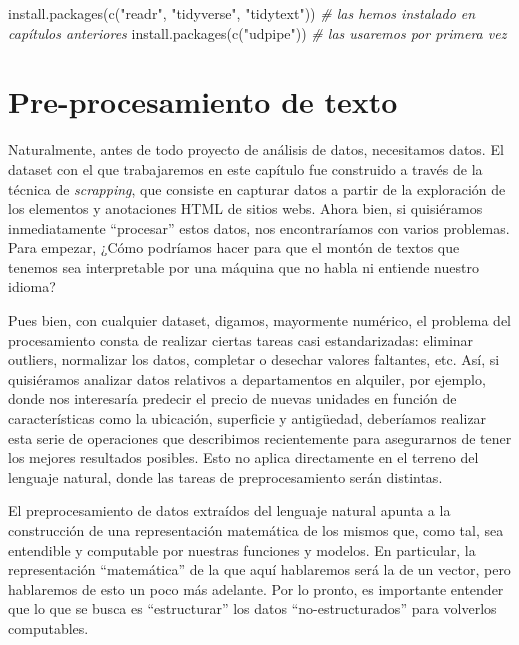 \documentclass[
]{book}
\newenvironment{Shaded}{\begin{snugshade}}{\end{snugshade}}
\newcommand{\CommentTok}[1]{\textcolor[rgb]{0.56,0.35,0.01}{\textit{#1}}}
\newcommand{\FunctionTok}[1]{\textcolor[rgb]{0.00,0.00,0.00}{#1}}
\newcommand{\NormalTok}[1]{#1}
\newcommand{\StringTok}[1]{\textcolor[rgb]{0.31,0.60,0.02}{#1}}
\begin{document}
\begin{Shaded}
\begin{Highlighting}[]
\FunctionTok{install.packages}\NormalTok{(}\FunctionTok{c}\NormalTok{(}\StringTok{"readr"}\NormalTok{, }\StringTok{"tidyverse"}\NormalTok{, }\StringTok{"tidytext"}\NormalTok{)) }\CommentTok{\# las hemos instalado en capítulos anteriores}
\FunctionTok{install.packages}\NormalTok{(}\FunctionTok{c}\NormalTok{(}\StringTok{"udpipe"}\NormalTok{)) }\CommentTok{\# las usaremos por primera vez}
\end{Highlighting}
\end{Shaded}

\hypertarget{pre-procesamiento-de-texto}{%
\section{Pre-procesamiento de texto}\label{pre-procesamiento-de-texto}}

Naturalmente, antes de todo proyecto de análisis de datos, necesitamos datos. El dataset con el que trabajaremos en este capítulo fue construido a través de la técnica de \emph{scrapping}, que consiste en capturar datos a partir de la exploración de los elementos y anotaciones HTML de sitios webs. Ahora bien, si quisiéramos inmediatamente ``procesar'' estos datos, nos encontraríamos con varios problemas. Para empezar, ¿Cómo podríamos hacer para que el montón de textos que tenemos sea interpretable por una máquina que no habla ni entiende nuestro idioma?

Pues bien, con cualquier dataset, digamos, mayormente numérico, el problema del procesamiento consta de realizar ciertas tareas casi estandarizadas: eliminar outliers, normalizar los datos, completar o desechar valores faltantes, etc. Así, si quisiéramos analizar datos relativos a departamentos en alquiler, por ejemplo, donde nos interesaría predecir el precio de nuevas unidades en función de características como la ubicación, superficie y antigüedad, deberíamos realizar esta serie de operaciones que describimos recientemente para asegurarnos de tener los mejores resultados posibles. Esto no aplica directamente en el terreno del lenguaje natural, donde las tareas de preprocesamiento serán distintas.

El preprocesamiento de datos extraídos del lenguaje natural apunta a la construcción de una representación matemática de los mismos que, como tal, sea entendible y computable por nuestras funciones y modelos. En particular, la representación ``matemática'' de la que aquí hablaremos será la de un vector, pero hablaremos de esto un poco más adelante. Por lo pronto, es importante entender que lo que se busca es ``estructurar'' los datos ``no-estructurados'' para volverlos computables.
\end{document}

